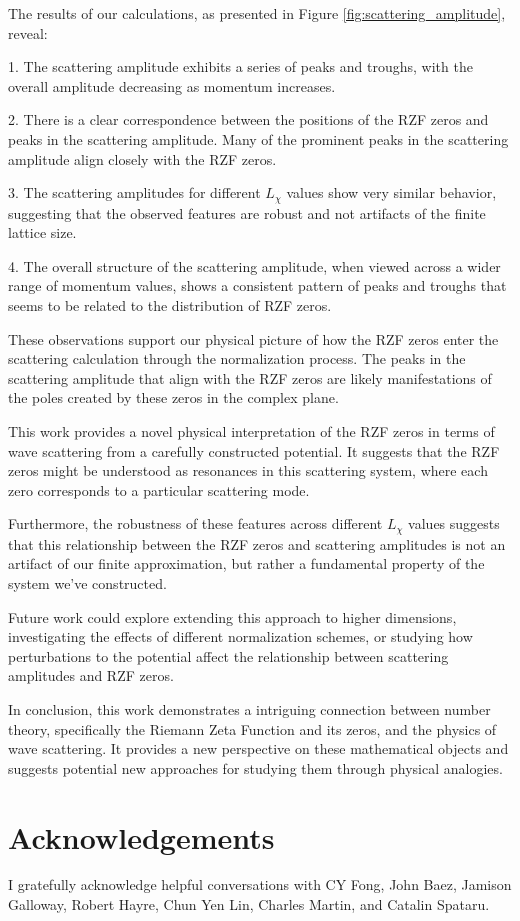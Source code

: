 \documentclass[11pt, oneside]{article}
\begin{document}
The results of our calculations, as presented in Figure \ref{fig:scattering_amplitude}, reveal:

1. The scattering amplitude exhibits a series of peaks and troughs, with the overall amplitude decreasing as momentum increases.

2. There is a clear correspondence between the positions of the RZF zeros and peaks in the scattering amplitude. Many of the prominent peaks in the scattering amplitude align closely with the RZF zeros.

3. The scattering amplitudes for different $L_\chi$ values show very similar behavior, suggesting that the observed features are robust and not artifacts of the finite lattice size.

4. The overall structure of the scattering amplitude, when viewed across a wider range of momentum values, shows a consistent pattern of peaks and troughs that seems to be related to the distribution of RZF zeros.

These observations support our physical picture of how the RZF zeros enter the scattering calculation through the normalization process. The peaks in the scattering amplitude that align with the RZF zeros are likely manifestations of the poles created by these zeros in the complex plane.

This work provides a novel physical interpretation of the RZF zeros in terms of wave scattering from a carefully constructed potential. It suggests that the RZF zeros might be understood as resonances in this scattering system, where each zero corresponds to a particular scattering mode.

Furthermore, the robustness of these features across different $L_\chi$ values suggests that this relationship between the RZF zeros and scattering amplitudes is not an artifact of our finite approximation, but rather a fundamental property of the system we've constructed.

Future work could explore extending this approach to higher dimensions, investigating the effects of different normalization schemes, or studying how perturbations to the potential affect the relationship between scattering amplitudes and RZF zeros.

In conclusion, this work demonstrates a intriguing connection between number theory, specifically the Riemann Zeta Function and its zeros, and the physics of wave scattering. It provides a new perspective on these mathematical objects and suggests potential new approaches for studying them through physical analogies.

\section{Acknowledgements}
I gratefully acknowledge helpful conversations with CY Fong, John Baez, Jamison Galloway, Robert Hayre, Chun Yen Lin, Charles Martin, and Catalin Spataru.

\printbibliography
\end{document}
